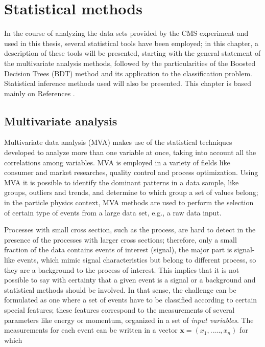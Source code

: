 \setcounter{chapter}{4}
\chapter{Statistical methods}\label{ch:stat}

In the course of analyzing the data sets provided by the CMS experiment and used in this thesis, several statistical tools have been employed; in this chapter, a description of these tools will be presented, starting with the general statement of the multivariate analysis methods, followed by the particularities of the Boosted Decision Trees (BDT) method and its application to the classification problem. Statistical inference methods used will also be presented. This chapter is based mainly on References \cite{mva, tmva, luca}.      

\section{Multivariate analysis}\label{sec:mva}

Multivariate data analysis (MVA) makes use of the statistical techniques developed to analyze more than one variable at once, taking into account all the correlations among variables. MVA is employed in a variety of fields like consumer and market researches, quality control and process optimization. Using MVA it is possible to identify the dominant patterns in a data sample, like groups, outliers and trends, and determine to which group a set of values belong; in the particle physics context, MVA methods are used to perform the selection of certain type of events from a large data set, e.g., a raw data input.

Processes with small cross section, such as the \tHq process, are hard to detect in the presence of the processes with larger cross sections; therefore, only a small fraction of the data contains events of interest (signal), the major part is signal-like events, which mimic signal characteristics but belong to different process, so they are a background to the process of interest. This implies that it is not possible to say with certainty that a given event is a signal or a background and statistical methods should be involved. In that sense, the challenge can be formulated as one where a set of events have to be classified according to certain special features; these features correspond to the measurements of several parameters like energy or momentum, organized in a set of \textit{input variables}. The measurements for each event can be written in a vector $\textbf{x}=(x_1,.....,x_n)$ for which

